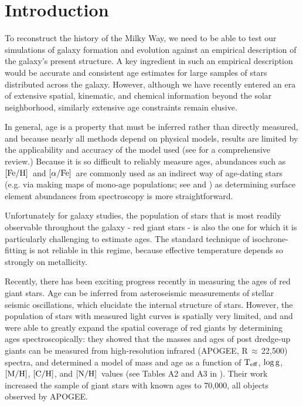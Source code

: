 \documentclass[12pt, preprint]{aastex}
\newcommand{\apogee}{APOGEE}
\newcommand{\teff}{\mbox{$\rm T_{eff}$}}
\newcommand{\logg}{\mbox{$\rm \log g$}}
\newcommand{\mh}{\mbox{$\rm [M/H]$}}
\newcommand{\feh}{\mbox{$\rm [Fe/H]$}}
\newcommand{\afe}{\mbox{$\rm [\alpha/Fe]$}}
\newcommand{\carbon}{\mbox{$\rm [C/H]$}}
\newcommand{\nitrogen}{\mbox{$\rm [N/H]$}}
\begin{document}
\section{Introduction}

To reconstruct the history of the Milky Way,
we need to be able to test our simulations of galaxy formation
and evolution against an empirical description of the galaxy's present 
structure.
A key ingredient in such an empirical description would be accurate and consistent age estimates for large samples of stars distributed
across the galaxy. However, although we have recently entered
an era of extensive spatial, kinematic, and chemical
information beyond the solar neighborhood, similarly extensive 
age constraints remain elusive.

In general, age is a property that must be
inferred rather than directly measured, 
and because nearly all methods depend on physical models, 
results are limited by the applicability and accuracy of the model used
(see \citet{Soderblom2010} for a comprehensive review.)
Because it is so difficult to reliably measure ages,
abundances such as \feh\ and \afe\ are commonly used as an 
indirect way of age-dating stars 
(e.g. via making maps of mono-age populations; 
see \cite{RixBovy2013} and \cite{Bovy2015}) 
as determining surface element abundances from spectroscopy
is more straightforward.

Unfortunately for galaxy studies,
the population of stars that is most readily observable throughout the
galaxy - red giant stars - is also the one for which it is particularly
challenging to estimate ages.
The standard technique of isochrone-fitting is not reliable in this regime,
because effective temperature depends so strongly on metallicity.

Recently, there has been exciting progress recently in measuring the ages of red giant stars. Age can be inferred from asteroseismic
measurements of stellar seismic oscillations, 
which elucidate the internal structure of stars. 
However, the population of stars with measured light curves is
spatially very limited, and \citet{Ness2016} and \citet{Martig2016}
were able to greatly expand the spatial coverage of red giants by
determining ages spectroscopically:
they showed that the masses
and ages of post dredge-up giants can be measured from high-resolution infrared (\apogee, R\,$\approx\,$22,500) spectra, and
determined a model of mass and age as a function of 
\teff, \logg, \mh, \carbon, and \nitrogen\ values 
(see Tables A2 and A3 in \citet{Martig2016}).
Their work increased the sample of giant stars with known ages
to 70,000, all objects observed by \apogee.
\end{document}
